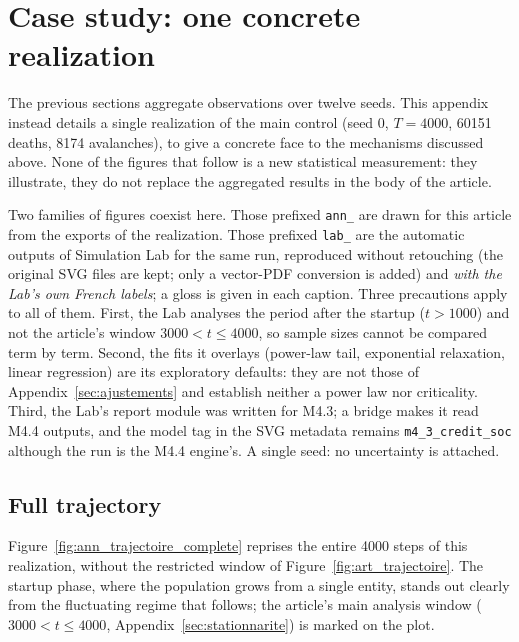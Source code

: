 \appendix
\FloatBarrier
\onecolumn

\twocolumn
\clearpage
\section{Case study: one concrete realization}\label{sec:etude_cas}
The previous sections aggregate observations over twelve seeds. This
appendix instead details a single realization of the main control (seed
0, $T=4000$, 60151 deaths, 8174 avalanches), to give a concrete face to
the mechanisms discussed above. None of the figures that follow is a new
statistical measurement: they illustrate, they do not replace the
aggregated results in the body of the article.

Two families of figures coexist here. Those prefixed \texttt{ann\_} are
drawn for this article from the exports of the realization. Those
prefixed \texttt{lab\_} are the automatic outputs of Simulation Lab for
the same run, reproduced without retouching (the original SVG files are
kept; only a vector-PDF conversion is added) and \emph{with the Lab's own
French labels}; a gloss is given in each caption. Three precautions apply
to all of them. First, the Lab analyses the period after the startup
($t>1000$) and not the article's window $3000<t\le4000$, so sample sizes
cannot be compared term by term. Second, the fits it overlays (power-law
tail, exponential relaxation, linear regression) are its exploratory
defaults: they are not those of Appendix~\ref{sec:ajustements} and
establish neither a power law nor criticality. Third, the Lab's report
module was written for M4.3; a bridge makes it read M4.4 outputs, and the
model tag in the SVG metadata remains \texttt{m4\_3\_credit\_soc} although
the run is the M4.4 engine's. A single seed: no uncertainty is attached.

\subsection{Full trajectory}
Figure~\ref{fig:ann_trajectoire_complete} reprises the entire 4000 steps
of this realization, without the restricted window of
Figure~\ref{fig:art_trajectoire}. The startup phase, where the
population grows from a single entity, stands out clearly from the
fluctuating regime that follows; the article's main analysis window
($3000<t\le4000$, Appendix~\ref{sec:stationnarite}) is marked on the
plot.


